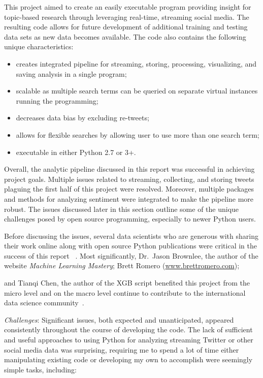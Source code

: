 This project aimed to create an easily executable program providing
insight for topic-based research through leveraging real-time,
streaming social media.  The resulting code allows for future
development of additional training and testing data sets as new data
becomes available.  The code also contains the following unique
characteristics:

\begin{itemize}
\item creates integrated pipeline for streaming,
storing, processing, visualizing, and saving
analysis in a single program; 
\item scalable as multiple search terms can be queried on separate virtual 
instances running the programming; 
\item decreases data bias by excluding re-tweets;
\item allows for flexible searches by allowing
user to use more than one search term;
\item executable in either Python 2.7 or 3+.
\end{itemize}

Overall, the analytic pipeline discussed in this report was successful
in achieving project goals.  Multiple issues related to streaming,
collecting, and storing tweets plaguing the first half of this project
were resolved.  Moreover, multiple packages and methods for analyzing
sentiment were integrated to make the pipeline more robust.  The
issues discussed later in this section outline some of the unique
challenges posed by open source programming, especially to newer
Python users.

Before discussing the issues, several data scientists who are generous
with sharing their work online along with open source Python
publications were critical in the success of this report
~\cite{sweigart2015,ojeda2014}.  Most significantly, Dr.\ Jason
Brownlee, the author of the website \emph{Machine Learning Mastery};
Brett Romero (\url{www.brettromero.com}); 


and Tianqi Chen, the author of the XGB script benefited this project
from the micro level and on the macro level continue to contribute to
the international data science
community~\cite{brownlee_2016,romero2016,Chen2016}.

\emph{Challenges}: Significant issues, both expected and
unanticipated, appeared consistently throughout the course of
developing the code.  The lack of sufficient and useful approaches to
using Python for analyzing streaming Twitter or other social media
data was surprising, requiring me to spend a lot of time either
manipulating existing code or developing my own to accomplish were
seemingly simple tasks, including:

